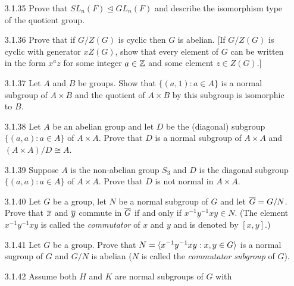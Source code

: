 \begin{enumerate}
   \item[3.1.35]  Prove that $SL_n(F) \trianglelefteq GL_n(F)$ and describe the
                  isomorphism type of the quotient group.
   \item[3.1.36]  Prove that if $G/Z(G)$ is cyclic then $G$ is abelian. [If
                  $G/Z(G)$ is cyclic with generator $xZ(G)$, show that every
                  element of $G$ can be written in the form $x^az$ for some
                  integer $a \in \mathbb{Z}$ and some element $z \in Z(G)$.]
   \item[3.1.37]  Let $A$ and $B$ be groups. Show that $\{(a, 1) : a \in A\}$ is
                  a normal subgroup of $A \times B$ and the quotient of
                  $A \times B$ by this subgroup is isomorphic to $B$.
   \item[3.1.38]  Let $A$ be an abelian group and let $D$ be the (diagonal)
                  subgroup $\{(a, a) : a \in A\}$ of $A \times A$. Prove that
                  $D$ is a normal subgroup of $A \times A$ and
                  $(A \times A)/D \cong A$.
   \item[3.1.39]  Suppose $A$ is the non-abelian group $S_3$ and $D$ is the
                  diagonal subgroup $\{(a, a) : a \in A\}$ of $A \times A$.
                  Prove that $D$ is not normal in $A \times A$.
   \item[3.1.40]  Let $G$ be a group, let $N$ be a normal subgroup of $G$ and
                  let $\overline{G} = G/N$. Prove that $\overline{x}$ and $\overline{y}$ commute in
                  $\overline{G}$ if and only if $x^{-1}y^{-1}xy \in N$. (The element
                  $x^{-1}y^{-1}xy$ is called the \textit{commutator} of $x$ and
                  $y$ and is denoted by $[x, y]$.)
   \item[3.1.41]  Let $G$ be a group. Prove that
                  $N = \langle x^{-1}y^{-1}xy : x, y \in G \rangle$ is a normal sugroup of
                  $G$ and $G/N$ is abelian ($N$ is called the
                  \textit{commutator subgroup} of $G$).
   \item[3.1.42]  Assume both $H$ and $K$ are normal subgroups of $G$ with

\end{enumerate}
